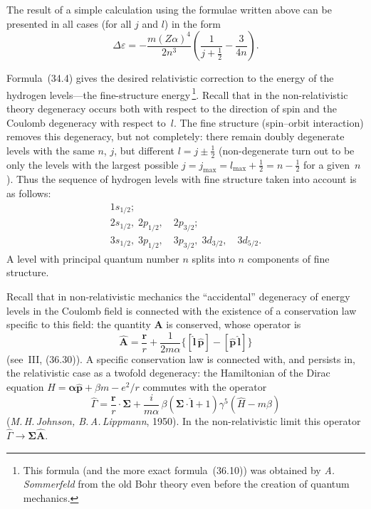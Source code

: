 The result of a simple calculation using the formulae written above can be presented in all cases (for all $j$ and $l$) in the form
\begin{equation}
\Delta\varepsilon = -\frac{m(Z\alpha)^4}{2n^3}\!\left(\frac{1}{j+\tfrac{1}{2}} - \frac{3}{4n}\right).
\tag{34.4}
\end{equation}

Formula~(34.4) gives the desired relativistic correction to the energy of the hydrogen levels---the fine-structure energy\,\footnote{This formula (and the more exact formula~(36.10)) was obtained by \textit{A.\,Sommerfeld} from the old Bohr theory even before the creation of quantum mechanics.}. Recall that in the non-relativistic theory degeneracy occurs both with respect to the direction of spin and the Coulomb degeneracy with respect to~$l$. The fine structure (spin--orbit interaction) removes this degeneracy, but not completely: there remain doubly degenerate levels with the same $n$, $j$, but different $l = j \pm \tfrac{1}{2}$ (non-degenerate turn out to be only the levels with the largest possible $j = j_{\max} = l_{\max} + \tfrac{1}{2} = n - \tfrac{1}{2}$ for a given~$n$). Thus the sequence of hydrogen levels with fine structure taken into account is as follows:
\[
\begin{array}{l}
1s_{1/2};\\[3pt]
2s_{1/2},\;2p_{1/2},\quad 2p_{3/2};\\[3pt]
3s_{1/2},\;3p_{1/2},\quad 3p_{3/2},\;3d_{3/2},\quad 3d_{5/2}.
\end{array}
\]
A level with principal quantum number $n$ splits into $n$ components of fine structure.

Recall that in non-relativistic mechanics the ``accidental'' degeneracy of energy levels in the Coulomb field is connected with the existence of a conservation law specific to this field: the quantity $\mathbf{A}$ is conserved, whose operator is
\[
\widehat{\mathbf{A}} = \frac{\mathbf{r}}{r} + \frac{1}{2m\alpha}\bigl\{[\widehat{\mathbf{l}}\,\widehat{\mathbf{p}}] - [\widehat{\mathbf{p}}\,\widehat{\mathbf{l}}]\bigr\}
\]
(see~III, (36.30)). A specific conservation law is connected with, and persists in, the relativistic case as a twofold degeneracy: the Hamiltonian of the Dirac equation $\widehat H = \boldsymbol{\alpha}\widehat{\mathbf{p}} + \beta m - e^2/r$ commutes with the operator
\[
\widehat\Gamma = \frac{\mathbf{r}}{r}\cdot\boldsymbol{\Sigma} + \frac{i}{m\alpha}\,\beta(\boldsymbol{\Sigma}\cdot\widehat{\mathbf{l}} + 1)\gamma^5(\widehat H - m\beta)
\]
(\textit{M.\,H.\,Johnson, B.\,A.\,Lippmann}, 1950). In the non-relativistic limit this operator $\widehat\Gamma \to \boldsymbol{\Sigma}\widehat{\mathbf{A}}$.

